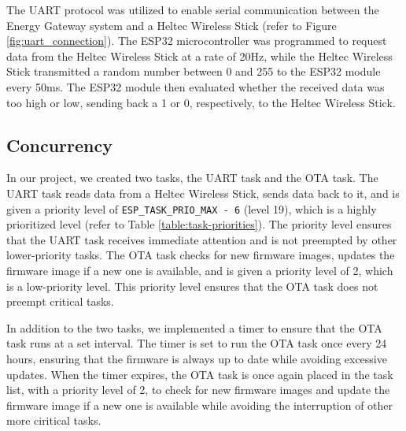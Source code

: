 The UART protocol was utilized to enable serial communication between the Energy Gateway system and a Heltec Wireless Stick (refer to Figure \ref{fig:uart_connection}). The ESP32 microcontroller was programmed to request data from the Heltec Wireless Stick at a rate of 20Hz, while the Heltec Wireless Stick transmitted a random number between 0 and 255 to the ESP32 module every 50ms. The ESP32 module then evaluated whether the received data was too high or low, sending back a 1 or 0, respectively, to the Heltec Wireless Stick.

\subsection{Concurrency}

In our project, we created two tasks, the UART task and the OTA task. The UART task reads data from a Heltec Wireless Stick, sends data back to it, and is given a priority level of \texttt{ESP\_TASK\_PRIO\_MAX - 6} (level 19), which is a highly prioritized level (refer to Table \ref{table:task-priorities}). The priority level ensures that the UART task receives immediate attention and is not preempted by other lower-priority tasks. The OTA task checks for new firmware images, updates the firmware image if a new one is available, and is given a priority level of 2, which is a low-priority level. This priority level ensures that the OTA task does not preempt critical tasks.

In addition to the two tasks, we implemented a timer to ensure that the OTA task runs at a set interval. The timer is set to run the OTA task once every 24 hours, ensuring that the firmware is always up to date while avoiding excessive updates. When the timer expires, the OTA task is once again placed in the task list, with a priority level of 2, to check for new firmware images and update the firmware image if a new one is available while avoiding the interruption of other more ciritical tasks.